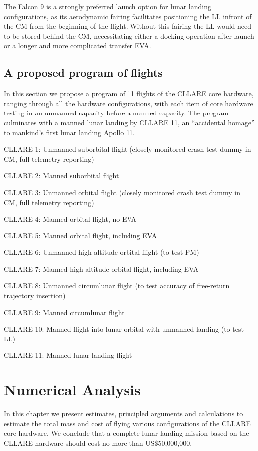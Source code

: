 \documentclass{report}
\begin{document}
The Falcon 9 is a strongly preferred launch option for lunar landing configurations, as its aerodynamic fairing facilitates positioning the LL infront of the CM from the beginning of the flight.  Without this fairing the LL would need to be stored behind the CM, necessitating either a docking operation after launch or a longer and more complicated transfer EVA.

\section{A proposed program of flights}

In this section we propose a program of 11 flights of the CLLARE core hardware, ranging through all the hardware configurations, with each item of core hardware testing in an unmanned capacity before a manned capacity.  The program culminates with a manned lunar landing by CLLARE 11, an ``accidental homage'' to mankind's first lunar landing Apollo 11.

CLLARE 1: Unmanned suborbital flight (closely monitored crash test dummy in CM, full telemetry reporting)

CLLARE 2: Manned suborbital flight

CLLARE 3: Unmanned orbital flight (closely monitored crash test dummy in CM, full telemetry reporting)

CLLARE 4: Manned orbital flight, no EVA

CLLARE 5: Manned orbital flight, including EVA

CLLARE 6: Unmanned high altitude orbital flight (to test PM)

CLLARE 7: Manned high altitude orbital flight, including EVA

CLLARE 8: Unmanned circumlunar flight (to test accuracy of free-return trajectory insertion)

CLLARE 9: Manned circumlunar flight

CLLARE 10: Manned flight into lunar orbital with unmanned landing (to test LL)

CLLARE 11: Manned lunar landing flight


\chapter{Numerical Analysis} \label{chap:numeric}

In this chapter we present estimates, principled arguments and calculations to estimate the total mass and cost of flying various configurations of the CLLARE core hardware.  We conclude that a complete lunar landing mission based on the CLLARE hardware should cost no more than US\$50,000,000.
\end{document}
